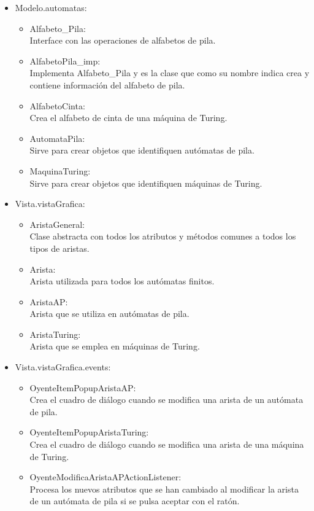 \documentclass[12pt,a4paper,spanish]{book}
\begin{document}
\begin{itemize}
\begin{itemize}
\end{itemize}
\item Modelo.automatas:
\begin{itemize}
\item Alfabeto\_Pila: \\Interface con las operaciones de alfabetos de pila.
\item AlfabetoPila\_imp:\\Implementa Alfabeto\_Pila y es la clase que como su nombre indica crea y contiene informaci\'on del alfabeto de pila.
\item AlfabetoCinta:\\Crea el alfabeto de cinta de una m\'aquina de Turing.
\item AutomataPila:\\Sirve para crear objetos que identifiquen aut\'omatas de pila.
\item MaquinaTuring:\\Sirve para crear objetos que identifiquen m\'aquinas de Turing.
\end{itemize}
\item Vista.vistaGrafica:
\begin{itemize}
\item AristaGeneral:\\Clase abstracta con todos los atributos y m\'etodos comunes a todos los tipos de aristas.
\item Arista:\\Arista utilizada para todos los aut\'omatas finitos.
\item AristaAP:\\Arista que se utiliza en aut\'omatas de pila.
\item AristaTuring:\\Arista que se emplea en m\'aquinas de Turing.\\
\end{itemize}
\item Vista.vistaGrafica.events:
\begin{itemize}
\item OyenteItemPopupAristaAP:\\Crea el cuadro de di\'alogo cuando se modifica una arista de un aut\'omata de pila.
\item OyenteItemPopupAristaTuring:\\Crea el cuadro de di\'alogo cuando se modifica una arista de una m\'aquina de Turing.
\item OyenteModificaAristaAPActionListener:\\Procesa los nuevos atributos que se han cambiado al modificar la arista de un aut\'omata de pila si se pulsa aceptar con el rat\'on.

\end{itemize}
\end{itemize}
\end{document}
